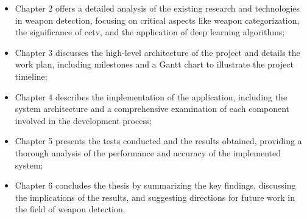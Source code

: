\begin{itemize}
    \item Chapter 2 offers a detailed analysis of the 
    existing research and technologies in weapon detection, focusing on critical aspects like weapon categorization, 
    the significance of \ac{cctv}, and the application of deep learning algorithms;
    \item Chapter 3 discusses the high-level architecture of the project and details the work plan, including 
    milestones and a Gantt chart to illustrate the project timeline;
    \item Chapter 4 describes the implementation of the application, including the system architecture and a 
    comprehensive examination of each component involved in the development process;
    \item Chapter 5 presents the tests conducted and the results obtained, providing a thorough analysis of 
    the performance and accuracy of the implemented system;
    \item Chapter 6 concludes the thesis by summarizing the key findings, discussing the implications of the 
    results, and suggesting directions for future work in the field of weapon detection.
\end{itemize}